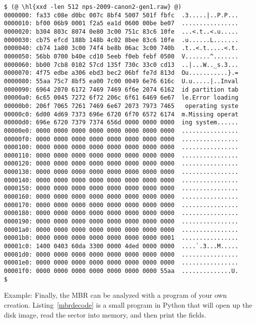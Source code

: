 \begin{Verbatim}
$ (@ \hl{xxd -len 512 nps-2009-canon2-gen1.raw} @)
0000000: fa33 c08e d0bc 007c 8bf4 5007 501f fbfc  .3.....|..P.P...
0000010: bf00 06b9 0001 f2a5 ea1d 0600 00be be07  ................
0000020: b304 803c 8074 0e80 3c00 751c 83c6 10fe  ...<.t..<.u.....
0000030: cb75 efcd 188b 148b 4c02 8bee 83c6 10fe  .u......L.......
0000040: cb74 1a80 3c00 74f4 be8b 06ac 3c00 740b  .t..<.t.....<.t.
0000050: 56bb 0700 b40e cd10 5eeb f0eb febf 0500  V.......^.......
0000060: bb00 7cb8 0102 57cd 135f 730c 33c0 cd13  ..|...W.._s.3...
0000070: 4f75 edbe a306 ebd3 bec2 06bf fe7d 813d  Ou...........}.=
0000080: 55aa 75c7 8bf5 ea00 7c00 0049 6e76 616c  U.u.....|..Inval
0000090: 6964 2070 6172 7469 7469 6f6e 2074 6162  id partition tab
00000a0: 6c65 0045 7272 6f72 206c 6f61 6469 6e67  le.Error loading
00000b0: 206f 7065 7261 7469 6e67 2073 7973 7465   operating syste
00000c0: 6d00 4d69 7373 696e 6720 6f70 6572 6174  m.Missing operat
00000d0: 696e 6720 7379 7374 656d 0000 0000 0000  ing system......
00000e0: 0000 0000 0000 0000 0000 0000 0000 0000  ................
00000f0: 0000 0000 0000 0000 0000 0000 0000 0000  ................
0000100: 0000 0000 0000 0000 0000 0000 0000 0000  ................
0000110: 0000 0000 0000 0000 0000 0000 0000 0000  ................
0000120: 0000 0000 0000 0000 0000 0000 0000 0000  ................
0000130: 0000 0000 0000 0000 0000 0000 0000 0000  ................
0000140: 0000 0000 0000 0000 0000 0000 0000 0000  ................
0000150: 0000 0000 0000 0000 0000 0000 0000 0000  ................
0000160: 0000 0000 0000 0000 0000 0000 0000 0000  ................
0000170: 0000 0000 0000 0000 0000 0000 0000 0000  ................
0000180: 0000 0000 0000 0000 0000 0000 0000 0000  ................
0000190: 0000 0000 0000 0000 0000 0000 0000 0000  ................
00001a0: 0000 0000 0000 0000 0000 0000 0000 0000  ................
00001b0: 0000 0000 0000 0000 0000 0000 0000 0001  ................
00001c0: 1400 0403 60da 3300 0000 4ded 0000 0000  ....`.3...M.....
00001d0: 0000 0000 0000 0000 0000 0000 0000 0000  ................
00001e0: 0000 0000 0000 0000 0000 0000 0000 0000  ................
00001f0: 0000 0000 0000 0000 0000 0000 0000 55aa  ..............U.
$ 
\end{Verbatim}

Example: Finally, the MBR can be analyzed with a program of your own
creation. Listing~\ref{mbrdecode} is a small program in Python that will open
up the disk image, read the sector into memory, and then print the
fields. 

